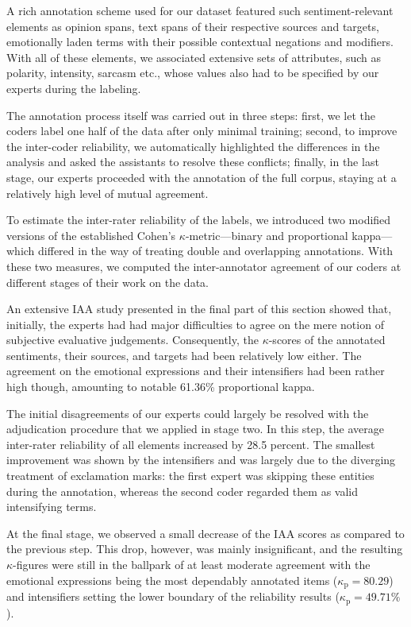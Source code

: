 A rich annotation scheme used for our dataset featured such
sentiment-relevant elements as opinion spans, text spans of their
respective sources and targets, emotionally laden terms with their
possible contextual negations and modifiers.  With all of these
elements, we associated extensive sets of attributes, such as
polarity, intensity, sarcasm etc., whose values also had to be
specified by our experts during the labeling.

The annotation process itself was carried out in three steps: first,
we let the coders label one half of the data after only minimal
training; second, to improve the inter-coder reliability, we
automatically highlighted the differences in the analysis and asked
the assistants to resolve these conflicts; finally, in the last stage,
our experts proceeded with the annotation of the full corpus, staying
at a relatively high level of mutual agreement.

To estimate the inter-rater reliability of the labels, we introduced
two modified versions of the established Cohen's
$\kappa$-metric---binary and proportional kappa---which differed in
the way of treating double and overlapping annotations.  With these
two measures, we computed the inter-annotator agreement of our coders
at different stages of their work on the data.

An extensive IAA study presented in the final part of this section
showed that, initially, the experts had had major difficulties to
agree on the mere notion of subjective evaluative judgements.
Consequently, the $\kappa$-scores of the annotated sentiments, their
sources, and targets had been relatively low either.  The agreement on
the emotional expressions and their intensifiers had been rather high
though, amounting to notable 61.36\% proportional kappa.

The initial disagreements of our experts could largely be resolved
with the adjudication procedure that we applied in stage two.  In this
step, the average inter-rater reliability of all elements increased by
28.5 percent.  The smallest improvement was shown by the intensifiers
and was largely due to the diverging treatment of exclamation marks:
the first expert was skipping these entities during the annotation,
whereas the second coder regarded them as valid intensifying terms.

At the final stage, we observed a small decrease of the IAA scores as
compared to the previous step.  This drop, however, was mainly
insignificant, and the resulting $\kappa$-figures were still in the
ballpark of at least moderate agreement with the emotional expressions
being the most dependably annotated items ($\kappa_\textrm{p}=80.29$)
and intensifiers setting the lower boundary of the reliability results
($\kappa_{\textrm{p}}=49.71\%$).

